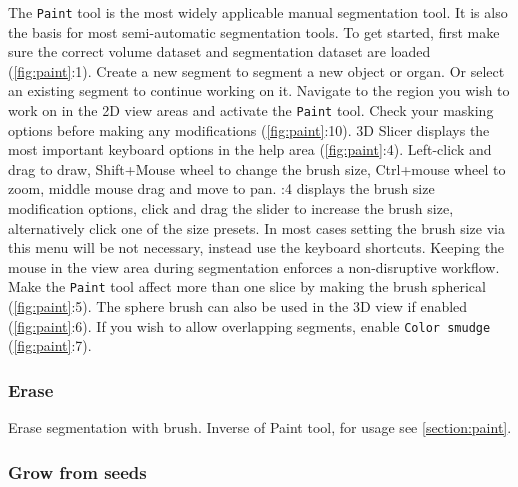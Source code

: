 \noindent
The \texttt{Paint} tool is the most widely applicable manual segmentation tool. It is also the basis for most semi-automatic segmentation tools.
To get started, first make sure the correct volume dataset and segmentation dataset are loaded (\cref{fig:paint}:1).
Create a new segment to segment a new object or organ.
Or select an existing segment to continue working on it.
Navigate to the region you wish to work on in the 2D view areas and activate the \texttt{Paint} tool.
Check your masking options before making any modifications (\cref{fig:paint}:10).
3D Slicer displays the most important keyboard options in the help area (\cref{fig:paint}:4).
Left-click and drag to draw, Shift+Mouse wheel to change the brush size, Ctrl+mouse wheel to zoom, middle mouse drag and move to pan.
:4 displays the brush size modification options, click and drag the slider to increase the brush size, alternatively click one of the size presets.
In most cases setting the brush size via this menu will be not necessary, instead use the keyboard shortcuts.
Keeping the mouse in the view area during segmentation enforces a non-disruptive workflow.
Make the \texttt{Paint} tool affect more than one slice by making the brush spherical (\cref{fig:paint}:5).
The sphere brush can also be used in the 3D view if enabled (\cref{fig:paint}:6).
If you wish to allow overlapping segments, enable \texttt{Color smudge} (\cref{fig:paint}:7).

\pagebreak
\subsubsection{Erase}
Erase segmentation with brush. Inverse of Paint tool, for usage see \cref{section:paint}.

\subsubsection{Grow from seeds}\label{section:gfs}
\begin{figure}[h]
	\begin{subfigure}{0.2\textwidth}
		
	\end{subfigure}
	\begin{subfigure}{0.2\textwidth}
		
	\end{subfigure}
\end{figure}

